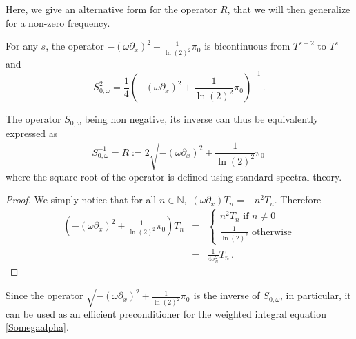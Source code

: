 \documentclass[a4paper]{article}
\begin{document}
Here, we give an alternative form for the operator $R$, that we will then generalize for a non-zero frequency. 
%
\begin{theorem}
	\label{TheSdx2S}
	For any $s$, the operator $-(\omega\partial_x)^2 + \frac{1}{\ln(2)^2} \pi_0 $ is bicontinuous from $T^{s+2}$ to $T^s$ and
	\begin{equation*}
		S_{0,\omega}^2 = \frac{1}{4}\left(-(\omega\partial_x)^2 + \frac{1}{\ln(2)^2} \pi_0 \right)^{-1}\,.
	\end{equation*}
\end{theorem}
\begin{Cor} The operator $S_{0,\omega}$ being non negative, its inverse can thus be equivalently expressed as 
\[S_{0,\omega}^{-1} = R := 2\sqrt{-(\omega \partial_x)^2 + \frac{1}{\ln(2)^2}\pi_0}\,\]
where the square root of the operator is defined using standard spectral theory. 
\end{Cor}
\begin{proof}
We simply notice that for all $n\in \mathbb{N},\,\,(\omega \partial_x)T_n = -n^2 T_n$. Therefore
\begin{eqnarray*}
 \left(-(\omega\partial_x)^2 + \frac{1}{\ln(2)^2} \pi_0\right)T_n  &=& \left\{
 \begin{array}{l} 
 n^2 T_n \mbox{ if } n\ne 0\\
 \frac{1}{\ln(2)^2} \mbox{ otherwise}
 \end{array}
 \right.\\
 &=& \frac{1}{4\sigma_n^2} T_n\,.
 \end{eqnarray*}
\end{proof}
Since the operator $\sqrt{-(\omega \partial_x)^2 + \frac{1}{\ln(2)^2}\pi_0}$ is the inverse of $S_{0,\omega}$, in particular, it can be used as an efficient preconditioner for the weighted integral equation \eqref{Somegaalpha}. 
\end{document}
